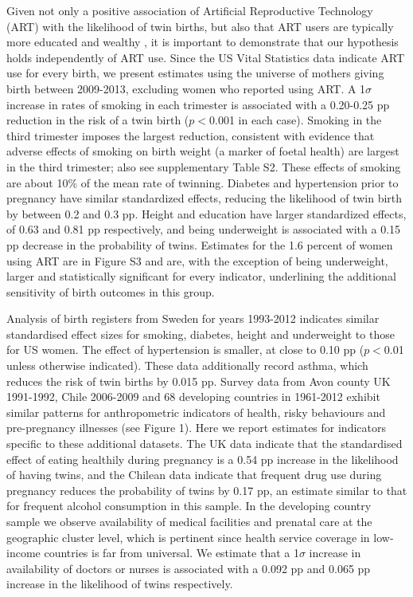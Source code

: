 \documentclass[11pt]{article}
\begin{document}
Given not only a positive association of Artificial Reproductive Technology (ART) with the likelihood of twin births\cite{Vitthalaetal2009}, but also that ART users are typically more educated and wealthy \cite{Lundborgetal2014}, it is important to demonstrate that our hypothesis holds independently of ART use. Since the US Vital Statistics data indicate ART use for every birth, we present estimates using  the universe of mothers giving birth between 2009-2013, excluding women who reported using ART. A 1$\sigma$ increase in rates of smoking in each trimester is associated with a 0.20-0.25 pp reduction in the risk of a twin birth ($p<$0.001 in each case). Smoking in the third trimester imposes the largest reduction, consistent with evidence that adverse effects of smoking on birth weight (a marker of foetal health) are largest in the third trimester\cite{Bernsteinetal2005}; also see supplementary Table S2.  These effects of smoking are about 10\% of the mean rate of twinning. Diabetes and hypertension prior to pregnancy have similar standardized effects, reducing the likelihood of twin birth by between 0.2 and 0.3 pp. Height and education have larger standardized effects, of 0.63 and 0.81 pp respectively, and being underweight is associated with a 0.15 pp decrease in the probability of twins. Estimates for the 1.6 percent of women using ART are in Figure S3 and are, with the exception of being underweight, larger and statistically significant for every indicator, underlining the additional sensitivity of birth outcomes in this group.

Analysis of birth registers from Sweden for years 1993-2012 indicates similar standardised effect sizes for smoking, diabetes, height and underweight to those for US women. The effect of hypertension is smaller, at close to 0.10 pp ($p<$0.01 unless otherwise indicated). These data additionally record asthma, which reduces the risk of twin births by 0.015 pp. Survey data from Avon county UK 1991-1992, Chile 2006-2009 and 68 developing countries in 1961-2012 exhibit similar patterns for anthropometric indicators of health, risky behaviours and pre-pregnancy illnesses (see Figure 1). Here we report estimates for indicators specific to these additional datasets. The UK data indicate that the standardised effect of eating healthily during pregnancy is a 0.54 pp increase in the likelihood of having twins, and the Chilean data indicate that frequent drug use during pregnancy reduces the probability of twins by 0.17 pp, an estimate similar to that for frequent alcohol consumption in this sample. In the developing country sample we observe availability of medical facilities and prenatal care at the geographic cluster level, which is pertinent since health service coverage in low-income countries is far from universal. We estimate that a 1$\sigma$ increase in  availability of doctors or nurses is associated with a 0.092 pp and 0.065 pp increase in the likelihood of twins respectively.
\end{document}
